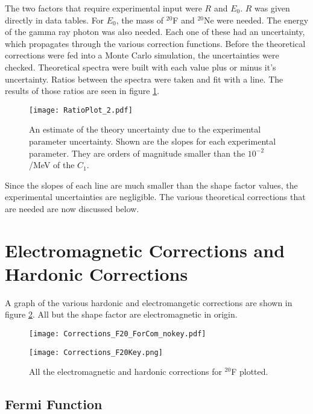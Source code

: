 The two factors that require experimental input were $R$ and $E_{0}$. 
$R$ was given directly in data tables.
For $E_{0}$, the mass of $^{20}$F and $^{20}$Ne were needed.
The energy of the gamma ray photon was also needed.
Each one of these had an uncertainty, which propagates through the various correction functions.
Before the theoretical corrections were fed into a Monte Carlo simulation, the uncertainties were checked.
Theoretical spectra were  built with each value plus or minus it's uncertainty.
Ratios between the spectra were taken and fit with a line.
The results of those ratios are seen in figure \ref{fig:theoryuncer}.

\begin{figure}[!htb]
	\centerline{\texttt{[image: RatioPlot\_2.pdf]}}
	\caption{An estimate of the theory uncertainty due to the experimental parameter uncertainty.	
		 Shown are the slopes for each experimental parameter. 
		 They are orders of magnitude smaller than the $10^{-2}$/MeV of the $C_{1}$.}
	\label{fig:theoryuncer}
\end{figure}

Since the slopes of each line are much smaller than the shape factor values, the experimental uncertainties are negligible. 
The various theoretical corrections that are needed are now discussed below.

\section{Electromagnetic Corrections and Hardonic Corrections}
A graph of the various hardonic and electromangetic corrections are shown in figure \ref{fig:corrections}.
All but the shape factor are electromagnetic in origin. 

\begin{figure}
    \centering
    \begin{minipage}{0.65\textwidth}
        \centerline{\texttt{[image: Corrections\_F20\_ForCom\_nokey.pdf]}} %
    \end{minipage}\hfill
    \begin{minipage}{0.35\textwidth}
        \centerline{\texttt{[image: Corrections\_F20Key.png]}}
    \end{minipage}
    \caption{All the electromagnetic and hardonic corrections for $^{20}$F plotted.}
    \label{fig:corrections}
\end{figure}

\subsection{Fermi Function}

